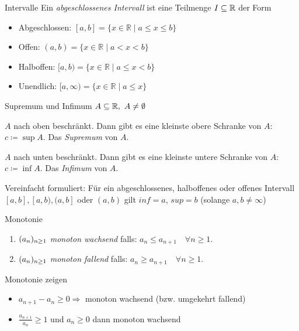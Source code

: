 \begin{definition}{Intervalle}
    Ein \emph{abgeschlossenes Intervall} ist eine Teilmenge $I \subseteq \mathbb{R}$ der Form
    \begin{itemize}
        \item Abgeschlossen:
            $[a, b]=\{x \in \mathbb{R} \mid a \leq x \leq b\}$
        \item Offen:
            $(a, b)=\{x \in \mathbb{R} \mid a<x<b\}$
        \item Halboffen:
            $[a, b)=\{x \in \mathbb{R} \mid a \leq x<b\}$
        \item Unendlich:
            $[a, \infty)=\{x \in \mathbb{R} \mid a \leq x\}$
    \end{itemize}
\end{definition}

\begin{definition}{Supremum und Infimum}
    $A \subseteq \mathbb{R}, ~A\neq \emptyset$
    \begin{enumerateroman}
        \item $A$ nach oben beschränkt. Dann gibt es eine kleinste obere Schranke von $A$: $c \coloneqq \sup A$. Das \emph{Supremum} von $A$.
        \item $A$ nach unten beschränkt. Dann gibt es eine kleinste untere Schranke von $A$: $c \coloneqq \inf A$. Das \emph{Infimum} von $A$.
    \end{enumerateroman}
    \tcblower 
    Vereinfacht formuliert: Für ein abgeschlossenes, halboffenes oder offenes Intervall $[a,b], [a,b), (a,b]$ oder $(a,b)$ gilt $inf = a$, $sup = b$ (solange $a, b \neq \infty$)
\end{definition}

\begin{definition}{Monotonie}
    \begin{enumerate}
        \item $(a_n)_{n \geq 1}$ \emph{monoton wachsend} falls: \null\hfill $a_n \leq a_{n + 1} \quad \forall n \geq 1$.
    	\item $(a_n)_{n \geq 1}$ \emph{monoton fallend} falls: \null\hfill $a_n \geq a_{n+1} \quad \forall n \geq 1$.
    \end{enumerate}
\end{definition}

\begin{KR}{Monotonie zeigen}
    \begin{itemize}
  \item $a_{n+1}-a_{n} \geq 0 \Rightarrow$ monoton wachsend (bzw. umgekehrt fallend)
  \item $\frac{a_{n+1}}{a_{n}} \geq 1$ und $a_{n} \geq 0$ dann monoton wachsend
\end{itemize}
\end{KR}

